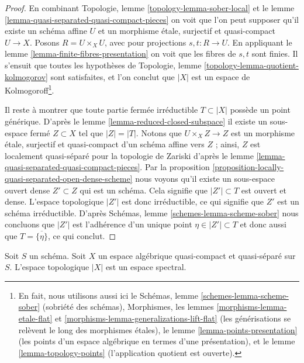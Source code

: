 \begin{proof}
En combinant
Topologie, lemme \ref{topology-lemma-sober-local}
et le
lemme \ref{lemma-quasi-separated-quasi-compact-pieces}
on voit que l'on peut supposer qu'il existe un schéma affine $U$
et un morphisme \'etale, surjectif et quasi-compact $U \to X$.
Posons $R = U \times_X U$, avec pour projections $s, t : R \to U$. En appliquant le
lemme \ref{lemma-finite-fibres-presentation}
on voit que les fibres de $s, t$ sont finies. Il s'ensuit que toutes les hypothèses de
Topologie, lemme \ref{topology-lemma-quotient-kolmogorov}
sont satisfaites, et l'on conclut que $|X|$ est un espace de Kolmogoroff\footnote{
En fait, nous utilisons aussi ici le
Schémas, lemme \ref{schemes-lemma-scheme-sober} (sobriété des schémas),
Morphismes, les lemmes \ref{morphisms-lemma-etale-flat}
et \ref{morphisms-lemma-generalizations-lift-flat} (les générisations
se relèvent le long des morphismes \'etales), le
lemme \ref{lemma-points-presentation} (les points d'un espace algébrique en
termes d'une présentation), et le
lemme \ref{lemma-topology-points} (l'application quotient est ouverte).}.

\medskip\noindent
Il reste à montrer que toute partie fermée irréductible
$T \subset |X|$ possède un point générique. D'après le
lemme \ref{lemma-reduced-closed-subspace}
il existe un sous-espace fermé $Z \subset X$ tel que $|Z| = |T|$.
Notons que $U \times_X Z \to Z$ est un morphisme \'etale, surjectif et
quasi-compact d'un schéma affine vers $Z$ ; ainsi, $Z$ est localement
quasi-séparé pour la topologie de Zariski d'après le
lemme \ref{lemma-quasi-separated-quasi-compact-pieces}.
Par la
proposition \ref{proposition-locally-quasi-separated-open-dense-scheme}
nous voyons qu'il existe un sous-espace ouvert dense $Z' \subset Z$
qui est un schéma. Cela signifie que $|Z'| \subset T$ est ouvert et dense.
L'espace topologique $|Z'|$ est donc irréductible, ce qui signifie que
$Z'$ est un schéma irréductible. D'après
Schémas, lemme \ref{schemes-lemma-scheme-sober}
nous concluons que $|Z'|$ est l'adhérence d'un unique point
$\eta \in |Z'| \subset T$ et donc aussi que $T = \overline{\{\eta\}}$, ce qui conclut.
\end{proof}

\begin{lemma}
\label{lemma-quasi-compact-quasi-separated-spectral}
Soit $S$ un schéma. Soit $X$ un espace algébrique quasi-compact et
quasi-séparé sur $S$. L'espace topologique $|X|$ est un espace spectral.
\end{lemma}

